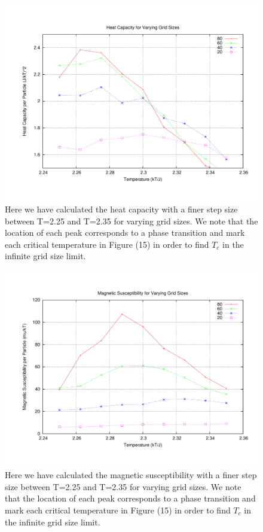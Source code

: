 \documentclass[11pt,a4paper]{article}
\begin{document}
\begin{figure}
\centering
\includegraphics[width=1.0\textwidth]{heatcapacity_zoom.pdf}
\caption{Here we have calculated the heat capacity with a finer step size between T=2.25 and T=2.35 for varying grid sizes. We note that the location of each peak corresponds to a phase transition and mark each critical temperature in Figure (15) in order to find $T_c$ in the infinite grid size limit.}
\end{figure}
\begin{figure}
\centering
\includegraphics[width=1.0\textwidth]{magsus_zoom.pdf}
\caption{Here we have calculated the magnetic susceptibility with a finer step size between T=2.25 and T=2.35 for varying grid sizes. We note that the location of each peak corresponds to a phase transition and mark each critical temperature in Figure (15) in order to find $T_c$ in the infinite grid size limit.}
\end{figure}
\end{document}
